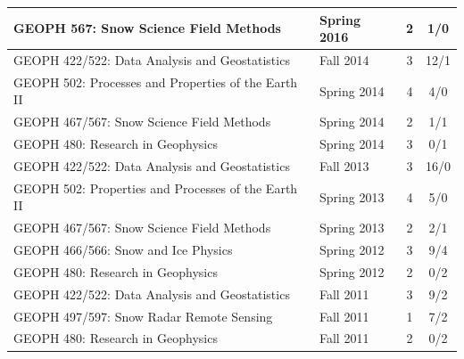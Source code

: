\documentclass[11pt]{article}
\begin{document}
\begin{table}[!htbp]
\begin{tabular}{|l|l|c|c|}
GEOPH 567: Snow Science Field Methods & Spring 2016 & 2 & 1/0 \\ \hline
GEOPH 422/522: Data Analysis and Geostatistics & Fall 2014 & 3 & 12/1 \\ \hline
GEOPH 502: Processes and Properties of the Earth II & Spring 2014 & 4 & 4/0 \\ \hline
GEOPH 467/567: Snow Science Field Methods & Spring 2014 & 2 & 1/1 \\ \hline
GEOPH 480: Research in Geophysics & Spring 2014 & 3 & 0/1 \\ \hline
GEOPH 422/522: Data Analysis and Geostatistics & Fall 2013 & 3 & 16/0 \\ \hline
GEOPH 502: Properties and Processes of the Earth II & Spring 2013 & 4 & 5/0 \\ \hline
GEOPH 467/567: Snow Science Field Methods & Spring 2013 & 2 & 2/1 \\ \hline
GEOPH 466/566: Snow and Ice Physics & Spring 2012 & 3 & 9/4 \\ \hline
GEOPH 480: Research in Geophysics & Spring 2012 & 2 & 0/2 \\ \hline
GEOPH 422/522: Data Analysis and Geostatistics & Fall 2011 & 3 & 9/2 \\ \hline
GEOPH 497/597: Snow Radar Remote Sensing & Fall 2011 & 1 & 7/2 \\ \hline
GEOPH 480: Research in Geophysics & Fall 2011 & 2 & 0/2 \\ \hline

\end{tabular}
\end{table}
\end{document}
